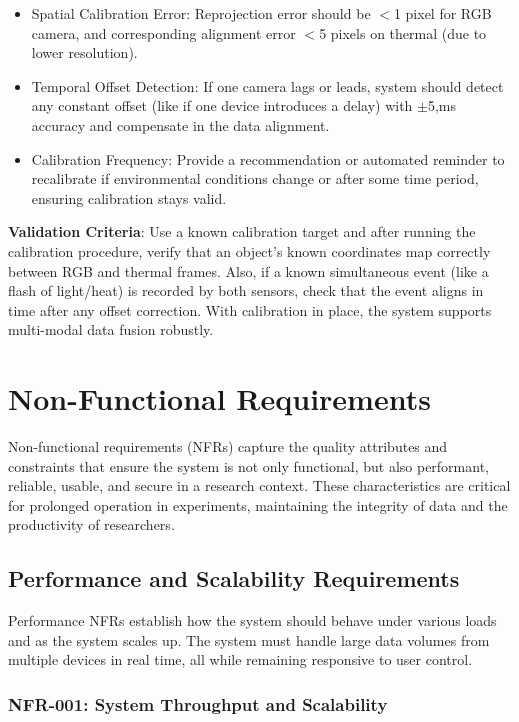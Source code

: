 \documentclass[11pt,a4paper]{report}
\begin{document}
\begin{itemize}
\item Spatial Calibration Error: Reprojection error should be $<$1 pixel for RGB camera, and corresponding alignment error $<$5 pixels on thermal (due to lower resolution).
\item Temporal Offset Detection: If one camera lags or leads, system should detect any constant offset (like if one device introduces a delay) with $\pm$5,ms accuracy and compensate in the data alignment.
\item Calibration Frequency: Provide a recommendation or automated reminder to recalibrate if environmental conditions change or after some time period, ensuring calibration stays valid.
\end{itemize} \textbf{Validation Criteria}: Use a known calibration target and after running the calibration procedure, verify that an object’s known coordinates map correctly between RGB and thermal frames. Also, if a known simultaneous event (like a flash of light/heat) is recorded by both sensors, check that the event aligns in time after any offset correction. With calibration in place, the system supports multi-modal data fusion robustly. \section{Non-Functional Requirements}
Non-functional requirements (NFRs) capture the quality attributes and constraints that ensure the system is not only functional, but also performant, reliable, usable, and secure in a research context. These characteristics are critical for prolonged operation in experiments, maintaining the integrity of data and the productivity of researchers. \subsection{Performance and Scalability Requirements}
Performance NFRs establish how the system should behave under various loads and as the system scales up. The system must handle large data volumes from multiple devices in real time, all while remaining responsive to user control. \subsubsection*{NFR-001: System Throughput and Scalability}
\end{document}
